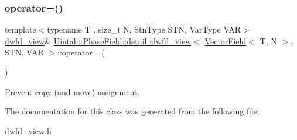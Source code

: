 \subsubsection{\texorpdfstring{operator=()}{operator=()}}
{\footnotesize\ttfamily template$<$typename T , size\+\_\+t N, Stn\+Type S\+TN, Var\+Type V\+AR$>$ \\
\hyperlink{classUintah_1_1PhaseField_1_1detail_1_1dwfd__view}{dwfd\+\_\+view}\& \hyperlink{classUintah_1_1PhaseField_1_1detail_1_1dwfd__view}{Uintah\+::\+Phase\+Field\+::detail\+::dwfd\+\_\+view}$<$ \hyperlink{structUintah_1_1PhaseField_1_1VectorField}{Vector\+Field}$<$ T, N $>$, S\+TN, V\+AR $>$\+::operator= (\begin{DoxyParamCaption}\item[{const \hyperlink{classUintah_1_1PhaseField_1_1detail_1_1dwfd__view}{dwfd\+\_\+view}$<$ \hyperlink{structUintah_1_1PhaseField_1_1VectorField}{Vector\+Field}$<$ T, N $>$, S\+TN, V\+AR $>$ \&}]{ }\end{DoxyParamCaption})\hspace{0.3cm}{\ttfamily [delete]}}



Prevent copy (and move) assignment. 



The documentation for this class was generated from the following file\+:\begin{DoxyCompactItemize}
\item 
\hyperlink{dwfd__view_8h}{dwfd\+\_\+view.\+h}\end{DoxyCompactItemize}

